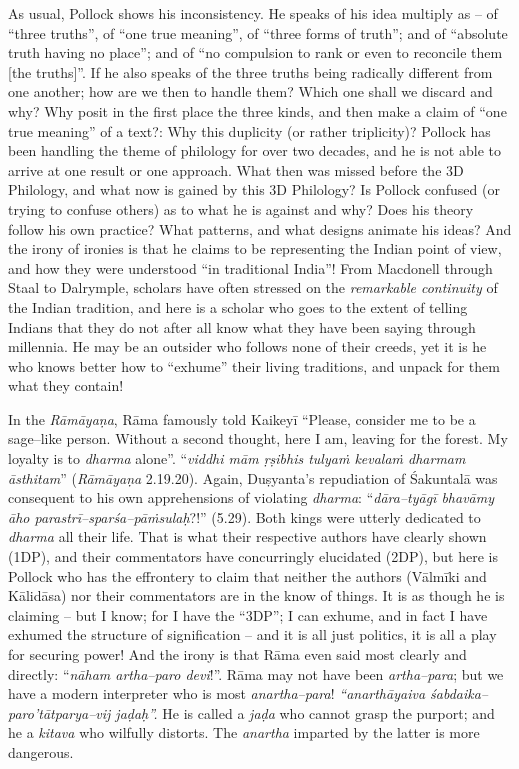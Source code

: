 As usual, Pollock shows his inconsistency. He speaks of his idea multiply as – of “three truths”, of “one true meaning”, of “three forms of truth”; and of “absolute truth having no place”; and of “no compulsion to rank or even to reconcile them [the truths]”. If he also speaks of the three truths being radically different from one another; how are we then to handle them? Which one shall we discard and why? Why posit in the first place the three kinds, and then make a claim of “one true meaning” of a text?: Why this duplicity (or rather triplicity)? Pollock has been handling the theme of philology for over two decades, and he is not able to arrive at one result or one approach. What then was missed before the 3D Philology, and what now is gained by this 3D Philology? Is Pollock confused (or trying to confuse others) as to what he is against and why? Does his theory follow his own practice? What patterns, and what designs animate his ideas? And the irony of ironies is that he claims to be representing the Indian point of view, and how they were understood “in traditional India”! From Macdonell through Staal to Dalrymple, scholars have often stressed on the \textit{remarkable continuity} of the Indian tradition, and here is a scholar who goes to the extent of telling Indians that they do not after all know what they have been saying through millennia. He may be an outsider who follows none of their creeds, yet it is he who knows better how to “exhume” their living traditions, and unpack for them what they contain!

In the \textit{Rāmāyaṇa}, Rāma famously told Kaikeyī “Please, consider me to be a sage–like person. Without a second thought, here I am, leaving for the forest. My loyalty is to \textit{dharma} alone”. “\textit{viddhi mām ṛṣibhis tulyaṁ kevalaṁ dharmam āsthitam}” (\textit{Rāmāyaṇa} 2.19.20). Again, Duṣyanta’s repudiation of Śakuntalā was consequent to his own apprehensions of violating \textit{dharma}: “\textit{dāra–tyāgī bhavāmy āho parastrī–sparśa–pāṁsulaḥ}?!” (5.29). Both kings were utterly dedicated to \textit{dharma} all their life. That is what their respective authors have clearly shown (1DP), and their commentators have concurringly elucidated (2DP), but here is Pollock who has the effrontery to claim that neither the authors (Vālmīki and Kālidāsa) nor their commentators are in the know of things. It is as though he is claiming – but I know; for I have the “3DP”; I can exhume, and in fact I have exhumed the structure of signification – and it is all just politics, it is all a play for securing power! And the irony is that Rāma even said most clearly and directly: “\textit{nāham artha–paro devi}!”. Rāma may not have been \textit{artha–para}; but we have a modern interpreter who is most \textit{anartha–para}! \textit{“anarthāyaiva śabdaika–paro’tātparya–vij jaḍaḥ”.} He is called a \textit{jaḍa} who cannot grasp the purport; and he a \textit{kitava} who wilfully distorts. The \textit{anartha} imparted by the latter is more dangerous.

